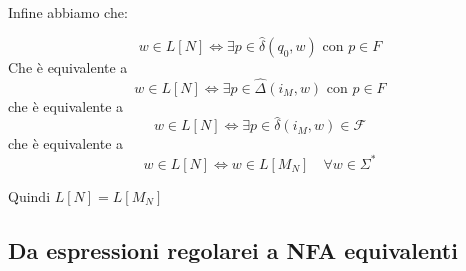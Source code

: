 {\begin{itemize}
    Infine abbiamo che:

    \[
        w\in L[N] \iff \exists p \in \hat{\delta}(q_0, w) \text{ con }p\in F
    \]
    Che è equivalente a 
    \[
        w\in L[N] \iff \exists p \in \hat{\Delta}(i_M, w) \text{ con }p\in F
    \]
    che è equivalente a
    \[
        w\in L[N] \iff \exists p \in \hat{\delta}(i_M, w)\in\mathcal{F}
    \]
    che è equivalente a 
    \[
        w\in L[N] \iff w\in L[M_N]\quad \forall w \in \Sigma^*
    \]

    Quindi $L[N] = L[M_N]$

\end{itemize}

}

\subsection{Da espressioni regolarei a NFA equivalenti}

